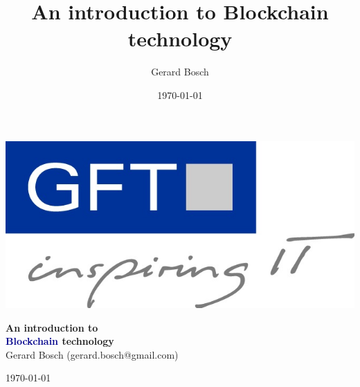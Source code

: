 \documentclass[notitlepage, usenames,dvipsnames]{beamer}
\title[Introduction to Blockchain Technology]{An introduction to Blockchain technology}
\author[Gerard Bosch]{Gerard Bosch}
\institute{\email{gerard.bosch@gmail.com}}
\date{\today}
\begin{document}
\begin{frame}
\begin{center}
\vspace{-4mm}\begin{center}\includegraphics[scale=0.15]{../img/gft.jpg}\end{center}

\vspace{1cm}
{\huge \bfseries \textcolor{MidnightBlue!100!bg}{ An introduction to\\[3mm] \textcolor{DarkBlue}{Blockchain} technology }} \\[3mm]

\vspace{1 cm}
Gerard Bosch (gerard.bosch@gmail.com)

\vspace{0.8cm}\today
\end{center}
\end{frame}



{}
\end{document}
